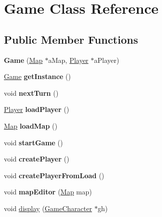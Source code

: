 \hypertarget{class_game}{}\section{Game Class Reference}
\label{class_game}
\subsection*{Public Member Functions}
\begin{DoxyCompactItemize}
\item 
\hypertarget{class_game_a0592b20bb4dafc38a3cfdb7c5f5e963f}{}\label{class_game_a0592b20bb4dafc38a3cfdb7c5f5e963f} 
{\bfseries Game} (\hyperlink{class_map}{Map} $\ast$a\+Map, \hyperlink{class_player}{Player} $\ast$a\+Player)
\item 
\hypertarget{class_game_a18d94ea20a9e7085faf15b0abb83a87c}{}\label{class_game_a18d94ea20a9e7085faf15b0abb83a87c} 
\hyperlink{class_game}{Game} {\bfseries get\+Instance} ()
\item 
\hypertarget{class_game_a801658c7cef474bc1d9a830f4a79034c}{}\label{class_game_a801658c7cef474bc1d9a830f4a79034c} 
void {\bfseries next\+Turn} ()
\item 
\hypertarget{class_game_a5d22cebed1061d51b2c3aaba2352972d}{}\label{class_game_a5d22cebed1061d51b2c3aaba2352972d} 
\hyperlink{class_player}{Player} {\bfseries load\+Player} ()
\item 
\hypertarget{class_game_ac7c8b111e2f09bbcf92a3da037992e57}{}\label{class_game_ac7c8b111e2f09bbcf92a3da037992e57} 
\hyperlink{class_map}{Map} {\bfseries load\+Map} ()
\item 
\hypertarget{class_game_ae8638ccdb0ef3bf39a6affa30aa1258f}{}\label{class_game_ae8638ccdb0ef3bf39a6affa30aa1258f} 
void {\bfseries start\+Game} ()
\item 
\hypertarget{class_game_a9e5b2d2156debcd958e2eae6fc79730a}{}\label{class_game_a9e5b2d2156debcd958e2eae6fc79730a} 
void {\bfseries create\+Player} ()
\item 
\hypertarget{class_game_a94515881419e23477226deba95dbb1f3}{}\label{class_game_a94515881419e23477226deba95dbb1f3} 
void {\bfseries create\+Player\+From\+Load} ()
\item 
\hypertarget{class_game_ac3276ead57322cccdeed919fd7f28b34}{}\label{class_game_ac3276ead57322cccdeed919fd7f28b34} 
void {\bfseries map\+Editor} (\hyperlink{class_map}{Map} map)
\item 
void \hyperlink{class_game_ac8c66f86b907bc8afc33c8e31b800611}{display} (\hyperlink{class_game_character}{Game\+Character} $\ast$gh)
\end{DoxyCompactItemize}


